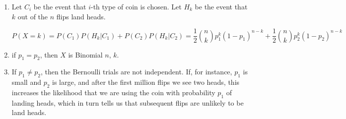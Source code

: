 \begin{enumerate}[label=(\alph*)]
\item Let $C_{i}$ be the event that $i$-th type of coin is chosen. Let $H_{k}$
be the event that $k$ out of the $n$ flips land heads.

$$P(X = k) = P(C_{1})P(H_{k}|C_{1}) + P(C_{2})P(H_{k}|C_{2}) = \frac{1}{2}
\binom{n}{k}p_{1}^{k}(1-p_{1})^{n-k}+ \frac{1}{2}
\binom{n}{k}p_{2}^{k}(1-p_{2})^{n-k}$$

\item if $p_{1} = p_{2}$, then $X$ is Binomial $n$, $k$.

\item If $p_{1} \neq p_{2}$, then the Bernoulli trials are not independent. If,
for instance, $p_{1}$ is small and $p_{2}$ is large, and after the first
million flips we see two heads, this increases the likelihood that we are using
the coin with probability $p_{1}$ of landing heads, which in turn tells us that subsequent flips are unlikely to be land heads.
\end{enumerate}